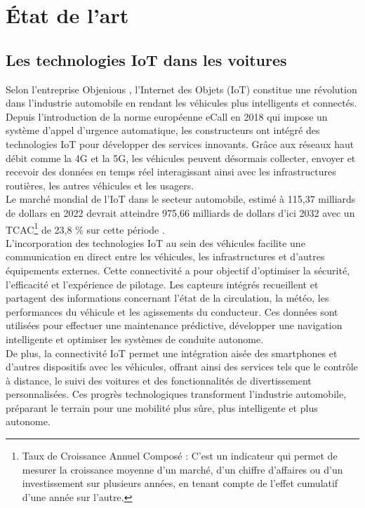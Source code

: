 \section{État de l'art}


\subsection{Les technologies IoT dans les voitures}

Selon l’entreprise Objenious \cite{noauthor_revolution_2025}, l’Internet des Objets (IoT) constitue une révolution dans l’industrie automobile en rendant les véhicules plus intelligents et connectés. Depuis l’introduction de la norme européenne eCall en 2018 qui impose un système d’appel d’urgence automatique, les constructeurs ont intégré des technologies IoT pour développer des services innovants. Grâce aux réseaux haut débit comme la 4G et la 5G, les véhicules peuvent désormais collecter, envoyer et recevoir des données en temps réel interagissant ainsi avec les infrastructures routières, les autres véhicules et les usagers.\\
Le marché mondial de l’IoT dans le secteur automobile, estimé à 115,37 milliards de dollars en 2022 devrait atteindre 975,66 milliards de dollars d’ici 2032 avec un TCAC\footnote{Taux de Croissance Annuel Composé : C’est un indicateur qui permet de mesurer la croissance moyenne d’un marché, d’un chiffre d’affaires ou d’un investissement sur plusieurs années, en tenant compte de l’effet cumulatif d’une année sur l’autre.} de 23,8 \% sur cette période \cite{noauthor_taille_2023}.\\
L'incorporation des technologies IoT au sein des véhicules facilite une communication en direct entre les véhicules, les infrastructures et d'autres équipements externes. Cette connectivité a pour objectif d'optimiser la sécurité, l'efficacité et l'expérience de pilotage. Les capteurs intégrés recueillent et partagent des informations concernant l'état de la circulation, la météo, les performances du véhicule et les agissements du conducteur. Ces données sont utilisées pour effectuer une maintenance prédictive, développer une navigation intelligente et optimiser les systèmes de conduite autonome.\\
De plus, la connectivité IoT permet une intégration aisée des smartphones et d'autres dispositifs avec les véhicules, offrant ainsi des services tels que le contrôle à distance, le suivi des voitures et des fonctionnalités de divertissement personnalisées. Ces progrès technologiques transforment l'industrie automobile, préparant le terrain pour une mobilité plus sûre, plus intelligente et plus autonome.

